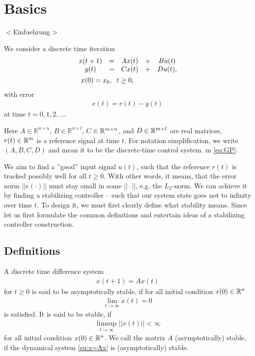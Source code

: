 \chapter{Basics} 
\label{ChGrDef}
{\color{red}$<$Einfuehrung$>$}

We consider a  discrete time iteration
\begin{align}
\label{eq:GP}
&\begin{array}{c c c c c}
x(t+1) &= &A x(t)& + &B u(t)  \\
y ( t) &= &C x(t)&  + &D u(t),\\ 
\end{array}\\
&\; \;\;x(0) =x_0 , \; \;  t \geq 0,
\end{align}
 with error 
\begin{align}
\label{eq:error}
e(t) =r(t) - y(t)
\end{align}
at time $t  = 0, 1, 2, \dots$.

Here $A \in \mathbb{R}^{n\times n}$, $B \in \mathbb{R}^{n \times l}$, $C \in {\mathbb{R}}^{m \times n}$, and $D \in {\mathbb{R}}^{m\times l}$ are real matrices, $r(t) \in {\mathbb{R}}^{m}$ is a reference signal at time $t$. For notation simplification, we write $(A, B,C,D)$ and mean it to be the discrete-time control system. m \eqref{eq:GP}.



We aim to find a ''good'' input signal $u(t)$, such that the reference $r(t)$ is tracked possibly well for all $t \geq 0$. With other words, it means, that the error norm $||e(\cdot)||$ must stay small in some  $||\cdot||$, e.g. the $L_2$-norm.
We can achieve it by finding a stabilizing controller -- such that our system state goes not to infinity over time $t$. 
To design it, we must first clearly define what stability means. Since let us first formulate the common definitions and entertain ideas of a stabilizing controller construction. 

\section{Definitions}

\begin{defi}
	A discrete time difference system
	\begin{align}
	\label{eq:x=Ax}
	x(t+1) = A x(t)
	\end{align}
	for $t \geq 0$ 
	is said to be asymptotically stable, if for all initial condition $x(0) \in {\mathbb{R}}^n$
	\begin{align}
	\lim_{t \to \infty} x(t) = 0
	\end{align}	
    is satisfied. 
	It is said to be stable, if 
	\begin{align}
	\limsup_{t \to \infty} ||x(t)|| < \infty
	\end{align}
	for all	 initial condition $x(0) \in {\mathbb{R}}^n$.
	We call the matrix $A$ (asymptotically) stable, if the dynamical system \eqref{eq:x=Ax} is (asymptotically) stable.
\end{defi}

